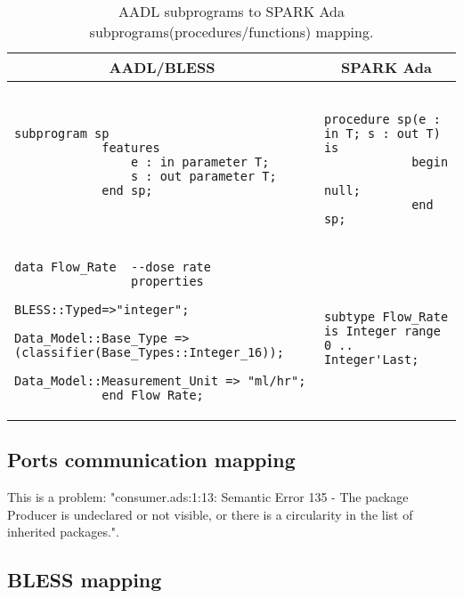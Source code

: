 \begin{table}[!ht]
	\caption{AADL subprograms to SPARK Ada subprograms(procedures/functions) mapping.}
	\label{table:subprograms_mapping}
	\centering
  	\begin{tabular}{ | p{3in} | p{3in} |}

		\hline
		\multicolumn{1}{|c|}{\textbf{AADL/BLESS}} & \multicolumn{1}{|c|}{\textbf{SPARK Ada}} \\ \hline

		\begin{lstlisting}[language=aadl]
			subprogram sp
			features
				e : in parameter T;
				s : out parameter T;
			end sp;
		\end{lstlisting} 
		& 
		\begin{lstlisting}
			procedure sp(e : in T; s : out T) is 
			begin
				null;
			end sp;
		\end{lstlisting} 

		\\ \hline

		\begin{lstlisting}[language=aadl]
			data Flow_Rate  --dose rate
  				properties
    				BLESS::Typed=>"integer";
    				Data_Model::Base_Type => (classifier(Base_Types::Integer_16));
    				Data_Model::Measurement_Unit => "ml/hr";
			end Flow_Rate;
		\end{lstlisting} 
		& 
		\begin{lstlisting}
			subtype Flow_Rate is Integer range 0 .. Integer'Last;
		\end{lstlisting} 

		\\ \hline
	\end{tabular}
\end{table}


\subsection{Ports communication mapping}

This is a problem: "consumer.ads:1:13: Semantic Error 135 - The package Producer is undeclared or not visible, or there is a circularity in the list of inherited packages.".


\subsection{BLESS mapping}
\label{codegen:mapping:bless}

